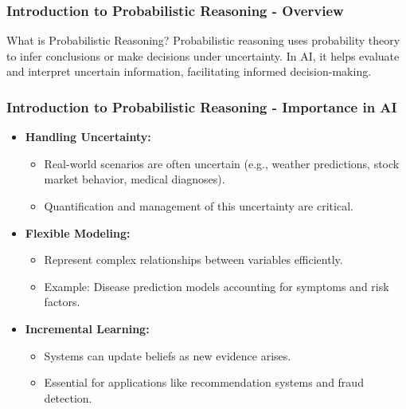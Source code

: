 \documentclass[aspectratio=169]{beamer}
\begin{document}
\frame{\titlepage}

\begin{frame}[fragile]
    \frametitle{Introduction to Probabilistic Reasoning - Overview}
    \begin{block}{What is Probabilistic Reasoning?}
        Probabilistic reasoning uses probability theory to infer conclusions or make decisions under uncertainty. In AI, it helps evaluate and interpret uncertain information, facilitating informed decision-making.
    \end{block}
\end{frame}

\begin{frame}[fragile]
    \frametitle{Introduction to Probabilistic Reasoning - Importance in AI}
    \begin{itemize}
        \item \textbf{Handling Uncertainty:}
            \begin{itemize}
                \item Real-world scenarios are often uncertain (e.g., weather predictions, stock market behavior, medical diagnoses).
                \item Quantification and management of this uncertainty are critical.
            \end{itemize}
        \item \textbf{Flexible Modeling:}
            \begin{itemize}
                \item Represent complex relationships between variables efficiently.
                \item Example: Disease prediction models accounting for symptoms and risk factors.
            \end{itemize}
        \item \textbf{Incremental Learning:}
            \begin{itemize}
                \item Systems can update beliefs as new evidence arises.
                \item Essential for applications like recommendation systems and fraud detection.
            \end{itemize}
    \end{itemize}
\end{frame}
\end{document}
